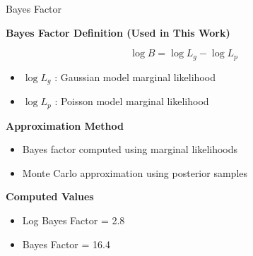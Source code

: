 \documentclass[aspectratio=169]{beamer}
\begin{document}
\begin{frame}{Bayes Factor}

\footnotesize

\textbf{Bayes Factor Definition (Used in This Work)}

\[
\log B = \log L_g - \log L_p
\]

\begin{itemize}

\item $\log L_g$ : Gaussian model marginal likelihood

\item $\log L_p$ : Poisson model marginal likelihood

\end{itemize}

\vspace{0.2cm}

\textbf{Approximation Method}

\begin{itemize}

\item Bayes factor computed using marginal likelihoods

\item Monte Carlo approximation using posterior samples

\end{itemize}

\vspace{0.2cm}

\textbf{Computed Values}

\begin{itemize}

\item Log Bayes Factor = 2.8

\item Bayes Factor = 16.4

\end{itemize}

\end{frame}
\end{document}

